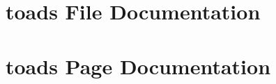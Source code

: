 \documentclass[a4paper]{article}
\begin{document}
\section{toads File Documentation}






























\section{toads Page Documentation}






\printindex
\end{document}
